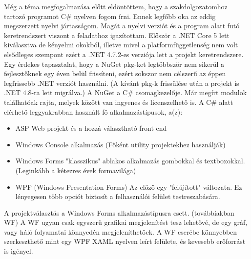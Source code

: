 

Még a téma megfogalmazása előtt eldöntöttem, hogy a szakdolgozatomhoz tartozó programot C\# nyelven fogom írni. Ennek legfőbb oka az eddig megszerzett nyelvi jártasságom. Magát a nyelvi verziót és a program alatt futó keretrendszert viszont a feladathoz igazítottam. Először a .NET Core 5 lett kiválasztva de kényelmi okokból, illetve mivel a platformfüggetlenség nem volt elsődleges szempont ezért  a .NET 4.7.2-es verziója lett a projekt keretrendszere. Egy érdekes tapasztalat, hogy a NuGet pkg-ket legtöbbször nem sikerül a fejlesztőknek egy éven belül frissíteni, ezért sokszor nem célszerű az éppen legfrissebb .NET verziót használni. (A kívánt pkg-k frissülése után a projekt is .NET 4.8-ra lett migrálva.) A NuGet a C\# csomagkezelője. Már megírt modulok találhatóak rajta, melyek között van ingyenes és licenszelhető is. A C\# alatt elérhető leggyakrabban használt fő alkalmazástípusok, a(z):
\begin{itemize}
\item ASP Web projekt és a hozzá választható front-end\\
\item Windows Console alkalmazás (Főként utility projektekhez használják)
\item Windows Forms "klasszikus" ablakos alkalmazás gombokkal és textboxokkal. (Leginkább a kétezres évek formavilága)
\item WPF (Windows Presentation Forms) Az előző egy "felújított" változata. Ez lényegesen több opciót biztosít a felhasználói felület testreszabására.
\end{itemize}

A projektválasztás a Windows Forms alkalmazástípusra esett. (továbbiakban WF) A WF ugyan csak egyszerű grafikai megjelenítést tesz lehetővé, de egy gráf, vagy háló folyamatai könnyedén megjeleníthetőek. A WF cserébe könnyebben szerkeszthető mint egy WPF XAML nyelven leírt felülete, és kevesebb erőforrást is igényel. 
\newpage
{}
